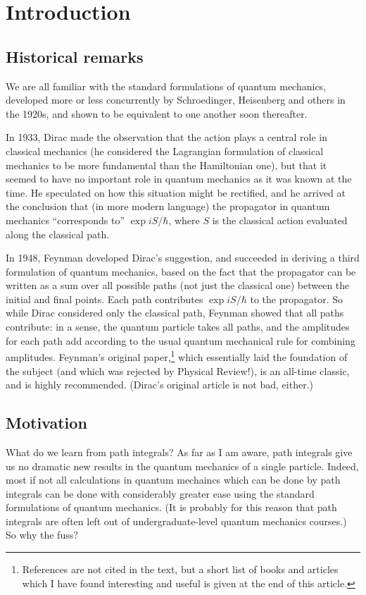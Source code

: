 \documentclass[12pt]{article}
\begin{document}
\newpage\thispagestyle{empty}
\section{Introduction}

\subsection{Historical remarks}
We are all familiar with the standard formulations of quantum
mechanics, developed more or less concurrently by Schroe\-ding\-er,
Heisenberg and others in the 1920s, and shown to be equivalent to one
another soon thereafter.

In 1933, Dirac made the observation that the action plays a central
role in classical mechanics (he considered the Lagrangian formulation
of classical mechanics to be more fundamental than the Hamiltonian
one), but that it seemed to have no important
role in quantum mechanics as it was known at the
time. He speculated on how this situation might be rectified,
and he arrived at the conclusion that (in more modern language) the
propagator in quantum mechanics ``corresponds to'' $\exp i S/\hbar$,
where $S$ is the classical action evaluated along the classical path.

In 1948, Feynman developed Dirac's suggestion, and succeeded in
deriving a third formulation of quantum mechanics, based on the fact
that the propagator can be written as a sum over all possible
paths (not just the classical one) between the
initial and final points. Each path contributes $\exp i S/\hbar$ to
the propagator. So while Dirac considered only the classical path,
Feynman showed that all paths contribute: in a sense, the quantum
particle takes all paths, and the amplitudes for each path add
according to the usual quantum mechanical rule for combining
amplitudes. Feynman's original paper,\footnote{References
  are not cited in the
  text, but a short list of books and articles which I have found
  interesting and useful is given at the end of this article.} 
which essentially laid the foundation of the subject (and which was
rejected by Physical Review!), is an all-time classic, and is highly
recommended. (Dirac's original article is not bad, either.)

\subsection{Motivation}  
What do we learn from path integrals? As far as I am aware, path
  integrals give us no dramatic new results in the quantum mechanics
  of a single particle. Indeed, most if not all calculations in
  quantum mechaincs which can
  be done by path integrals can be done with considerably greater ease
  using the standard formulations of quantum mechanics. (It is
  probably for this reason that path integrals are often left out of
  undergraduate-level quantum mechanics courses.) So why the fuss?
\end{document}
